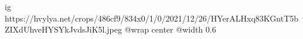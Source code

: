  
 
 
 
 

\ifcmt
  ig https://hvylya.net/crops/486cf9/834x0/1/0/2021/12/26/HYerALHxq83KGntT5bZIXdUhveHYSYkJvdsJiK5l.jpeg
	@wrap center
	@width 0.6
\fi
